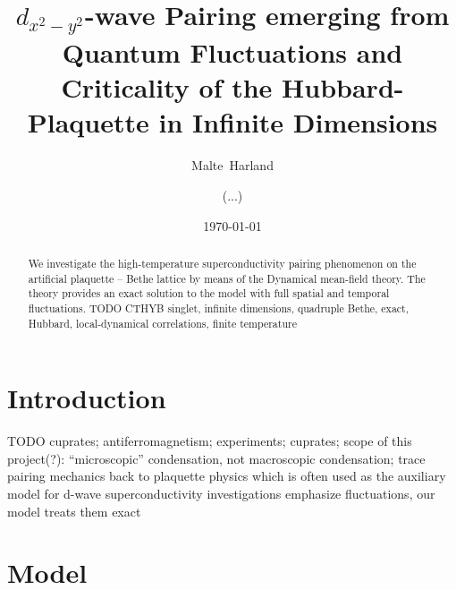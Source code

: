 \documentclass[aps,prb,twocolumn,groupedaddress,amsmath,amssymb]{revtex4-1}
\begin{document}
\title{$d_{x^2-y^2}$-wave Pairing emerging from Quantum Fluctuations and Criticality of the Hubbard-Plaquette in Infinite Dimensions}
\author{Malte~Harland}
\author{(...)}
\date{\today}
\begin{abstract}
  We investigate the high-temperature superconductivity pairing phenomenon on the artificial plaquette -- Bethe lattice by means of the Dynamical mean-field theory. The theory provides an exact solution to the model with full spatial and temporal fluctuations. TODO CTHYB singlet, infinite dimensions, quadruple Bethe, exact, Hubbard, local-dynamical correlations, finite temperature
\end{abstract}
\maketitle

\section{Introduction}
TODO\cite{Scalapino2012}
cuprates\cite{Damascelli2003};
antiferromagnetism;
experiments; cuprates;
scope of this project(?): ``microscopic'' condensation, not macroscopic condensation;
trace pairing mechanics back to plaquette physics which is often used as the auxiliary model for d-wave superconductivity investigations
emphasize fluctuations, our model treats them exact

\section{Model}
\end{document}
